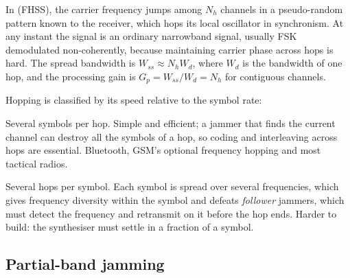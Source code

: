 In  (FHSS), the carrier frequency jumps among $N_h$
channels in a pseudo-random pattern known to the receiver, which hops its local oscillator in
synchronism. At any instant the signal is an ordinary narrowband signal, usually FSK
demodulated non-coherently, because maintaining carrier phase across hops is hard. The
spread bandwidth is $W_{ss}\approx N_hW_d$, where $W_d$ is the bandwidth of one hop, and the
processing gain is $G_p=W_{ss}/W_d=N_h$ for contiguous channels.

Hopping is classified by its speed relative to the symbol rate:
\begin{description}[style=nextline,leftmargin=1.2em,font=\sffamily\bfseries\small\color{navy}]
\item[Slow hopping.] Several symbols per hop. Simple and efficient; a jammer that finds the
current channel can destroy all the symbols of a hop, so coding and interleaving across
hops are essential. Bluetooth, GSM's optional frequency hopping and most tactical radios.
\item[Fast hopping.] Several hops per symbol. Each symbol is spread over several frequencies,
which gives frequency diversity within the symbol and defeats \emph{follower} jammers,
which must detect the frequency and retransmit on it before the hop ends. Harder to
build: the synthesiser must settle in a fraction of a symbol.
\end{description}


\subsection{Partial-band jamming}

